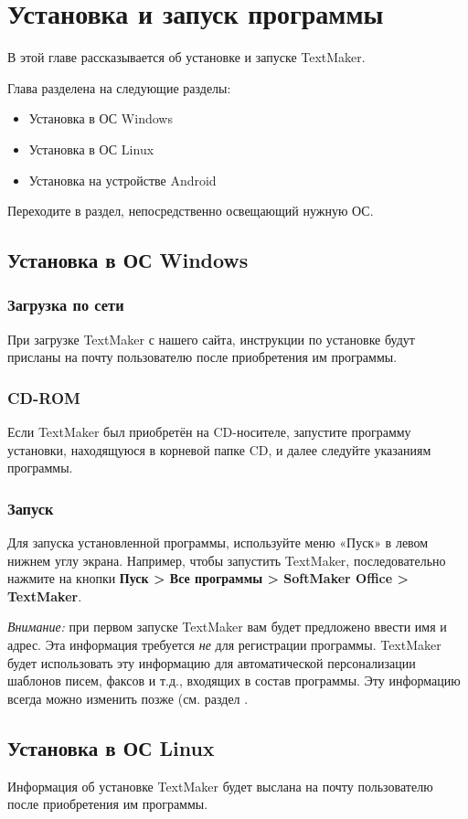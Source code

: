 ﻿\documentclass[a4paper,10pt]{article}
\begin{document}
\section {Установка и запуск программы} \label{sec:уизп}
В этой главе рассказывается об установке и запуске TextMaker.

Глава разделена на следующие разделы:
\begin{itemize}
 \item Установка в ОС Windows
 \item Установка в ОС Linux
 \item Установка на устройстве Android
\end{itemize}
Переходите в раздел, непосредственно освещающий нужную ОС.
\subsection{Установка в ОС Windows}
\subsubsection{Загрузка по сети}
При загрузке TextMaker с нашего сайта, инструкции по установке будут присланы на почту пользователю после приобретения им программы.
\subsubsection{CD-ROM}
Если TextMaker был приобретён на CD-носителе, запустите программу установки, находящуюся в корневой папке CD, и далее следуйте указаниям программы.
\subsubsection{Запуск}
Для запуска установленной программы, используйте меню «Пуск» в левом нижнем углу экрана. Например, чтобы запустить TextMaker, последовательно нажмите на кнопки \textbf{Пуск > Все программы > SoftMaker Office > TextMaker}.

{\footnotesize \textit{Внимание:} при первом запуске TextMaker вам будет предложено ввести имя и адрес. Эта информация требуется \textit{не} для регистрации программы. TextMaker будет использовать эту информацию для автоматической персонализации шаблонов писем, факсов и т.д., входящих в состав программы. Эту информацию всегда можно изменить позже (см. раздел .}

\subsection{Установка в ОС Linux}
Информация об установке TextMaker будет выслана на почту пользователю после приобретения им программы.
\end{document}
